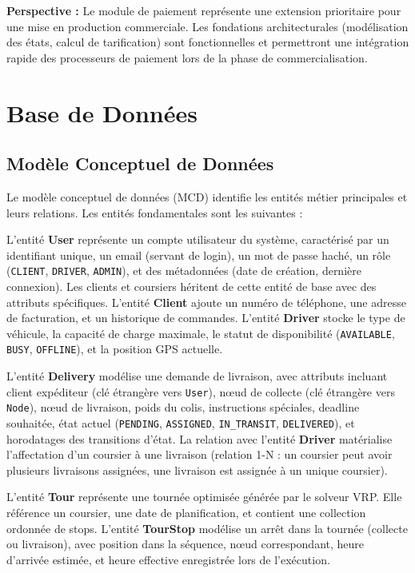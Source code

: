 \textbf{Perspective :} Le module de paiement représente une extension prioritaire pour une mise en production commerciale. Les fondations architecturales (modélisation des états, calcul de tarification) sont fonctionnelles et permettront une intégration rapide des processeurs de paiement lors de la phase de commercialisation.

\section{Base de Données}

\subsection{Modèle Conceptuel de Données}

Le modèle conceptuel de données (MCD) identifie les entités métier principales et leurs relations. Les entités fondamentales sont les suivantes :

L'entité \textbf{User} représente un compte utilisateur du système, caractérisé par un identifiant unique, un email (servant de login), un mot de passe haché, un rôle (\texttt{CLIENT}, \texttt{DRIVER}, \texttt{ADMIN}), et des métadonnées (date de création, dernière connexion). Les clients et coursiers héritent de cette entité de base avec des attributs spécifiques. L'entité \textbf{Client} ajoute un numéro de téléphone, une adresse de facturation, et un historique de commandes. L'entité \textbf{Driver} stocke le type de véhicule, la capacité de charge maximale, le statut de disponibilité (\texttt{AVAILABLE}, \texttt{BUSY}, \texttt{OFFLINE}), et la position GPS actuelle.

L'entité \textbf{Delivery} modélise une demande de livraison, avec attributs incluant client expéditeur (clé étrangère vers \texttt{User}), nœud de collecte (clé étrangère vers \texttt{Node}), nœud de livraison, poids du colis, instructions spéciales, deadline souhaitée, état actuel (\texttt{PENDING}, \texttt{ASSIGNED}, \texttt{IN\_TRANSIT}, \texttt{DELIVERED}), et horodatages des transitions d'état. La relation avec l'entité \textbf{Driver} matérialise l'affectation d'un coursier à une livraison (relation 1-N : un coursier peut avoir plusieurs livraisons assignées, une livraison est assignée à un unique coursier).

L'entité \textbf{Tour} représente une tournée optimisée générée par le solveur VRP. Elle référence un coursier, une date de planification, et contient une collection ordonnée de stops. L'entité \textbf{TourStop} modélise un arrêt dans la tournée (collecte ou livraison), avec position dans la séquence, nœud correspondant, heure d'arrivée estimée, et heure effective enregistrée lors de l'exécution.

